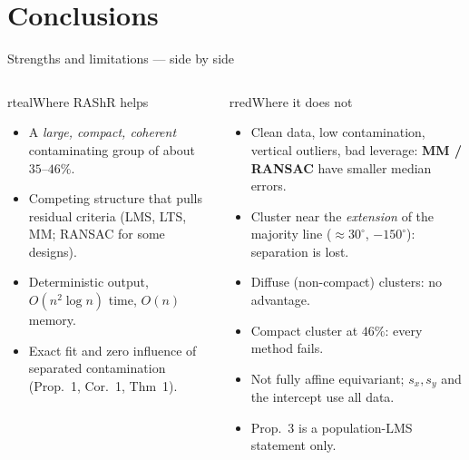 \documentclass[aspectratio=169,9pt]{beamer}
\begin{document}
\section{Conclusions}
\begin{frame}{Strengths and limitations --- side by side}
\begin{columns}[T]
\begin{rbox}{rteal}{Where RAShR helps}{}{}
\begin{itemize}\setlength\itemsep{3pt}
\item A \emph{large, compact, coherent} contaminating group of about $35$--$46\%$.
\item Competing structure that pulls residual criteria (LMS, LTS, MM; RANSAC for some designs).
\item Deterministic output, $O(n^2\log n)$ time, $O(n)$ memory.
\item Exact fit and zero influence of separated contamination (Prop.~1, Cor.~1, Thm~1).
\end{itemize}
\end{rbox}
\begin{rbox}{rred}{Where it does not}{}{}
\begin{itemize}\setlength\itemsep{3pt}
\item Clean data, low contamination, vertical outliers, bad leverage: \textbf{MM / RANSAC} have smaller median errors.
\item Cluster near the \emph{extension} of the majority line ($\approx30^\circ$, $-150^\circ$): separation is lost.
\item Diffuse (non-compact) clusters: no advantage.
\item Compact cluster at $46\%$: every method fails.
\item Not fully affine equivariant; $s_x,s_y$ and the intercept use all data.
\item Prop.~3 is a population-LMS statement only.
\end{itemize}
\end{rbox}
\end{columns}
\end{frame}
\end{document}
